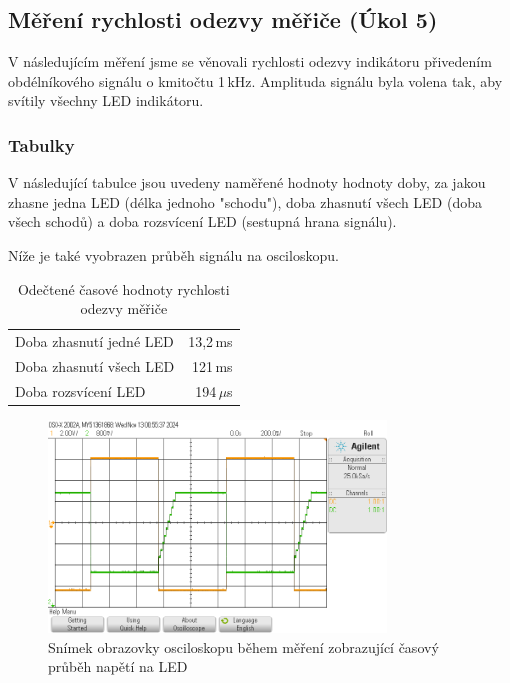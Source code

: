 \documentclass[a4paper, czech]{article}
\begin{document}
\pagebreak

\subsection{Měření rychlosti odezvy měřiče (Úkol 5)}

V následujícím měření jsme se věnovali rychlosti odezvy indikátoru přivedením obdélníkového signálu o kmitočtu 1\,kHz.
Amplituda signálu byla volena tak, aby svítily všechny LED indikátoru.

\subsubsection{Tabulky}

V následující tabulce jsou uvedeny naměřené hodnoty hodnoty doby, za jakou zhasne jedna LED (délka jednoho "schodu"), doba zhasnutí všech LED (doba všech schodů) a doba rozsvícení LED (sestupná hrana signálu).

Níže je také vyobrazen průběh signálu na osciloskopu.

\begin{table}[H]
    \centering
    \caption{Odečtené časové hodnoty rychlosti odezvy měřiče}
    \begin{tabular}{lr}
        \toprule
        Doba zhasnutí jedné LED & 13,2\,ms \\
        Doba zhasnutí všech LED & 121\,ms \\
        Doba rozsvícení LED & 194\,$\mu$s \\
        \bottomrule
    \end{tabular}
\end{table}

\begin{figure}[H]
    \centering
    \includegraphics[width=0.8\textwidth]{osciloskop_uloha8.png}
    \caption{Snímek obrazovky osciloskopu během měření zobrazující časový průběh napětí na LED}
\end{figure}
\end{document}
